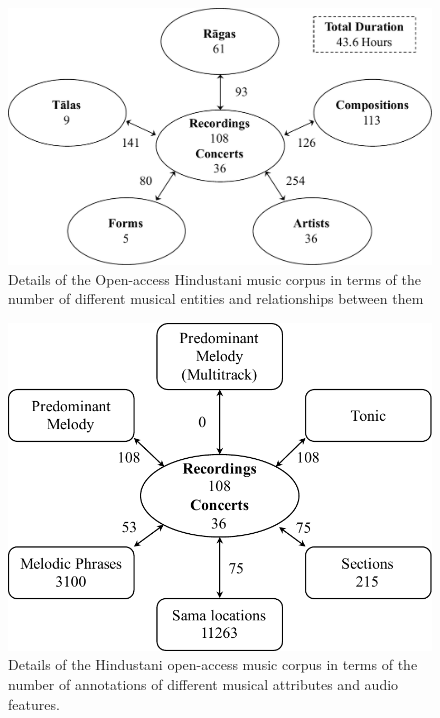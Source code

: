 \begin{figure}
	\begin{center}
		\includegraphics[width=\figSizeNinety]{ch04_datasets/figures/hindustani_corpus_cc.pdf}
	\end{center}
	\caption[Details of the Open-access Hindustani music corpus]{Details of the Open-access Hindustani music corpus in terms of the number of different musical entities and relationships between them}
	\label{fig:hindustani_cc_corpus_details}
\end{figure}

\begin{figure}
	\begin{center}
		\includegraphics[width=\figSizeSeventyFive]{ch04_datasets/figures/hindustani_CC_details.pdf}
	\end{center}
	\caption[Details of the open-access Hindustani music corpus]{Details of the Hindustani open-access music corpus in terms of the number of annotations of different musical attributes and audio features.}
	\label{fig:hindustani_open_access_corpus_details_annotations}
\end{figure}

